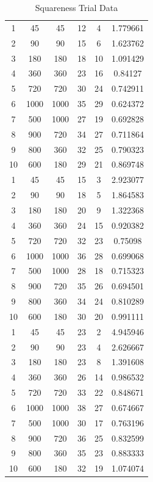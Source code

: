 \documentclass[10pt]{article}
\begin{document}
\begin{table}[H]
\begin{tabular}{cccccc}
        1  & 45   & 45   & 12 & 4  & 1.779661 \\
        2  & 90   & 90   & 15 & 6  & 1.623762 \\
        3  & 180  & 180  & 18 & 10 & 1.091429 \\
        4  & 360  & 360  & 23 & 16 & 0.84127 \\
        5  & 720  & 720  & 30 & 24 & 0.742911 \\
        6  & 1000 & 1000 & 35 & 29 & 0.624372 \\
        7  & 500  & 1000 & 27 & 19 & 0.692828 \\
        8  & 900  & 720  & 34 & 27 & 0.711864 \\
        9  & 800  & 360  & 32 & 25 & 0.790323 \\
        10 & 600  & 180  & 29 & 21 & 0.869748 \\
        \midrule

        1  & 45   & 45   & 15 & 3  & 2.923077 \\
        2  & 90   & 90   & 18 & 5  & 1.864583 \\
        3  & 180  & 180  & 20 & 9  & 1.322368 \\
        4  & 360  & 360  & 24 & 15 & 0.920382 \\
        5  & 720  & 720  & 32 & 23 & 0.75098 \\
        6  & 1000 & 1000 & 36 & 28 & 0.699068 \\
        7  & 500  & 1000 & 28 & 18 & 0.715323 \\
        8  & 900  & 720  & 35 & 26 & 0.694501 \\
        9  & 800  & 360  & 34 & 24 & 0.810289 \\
        10 & 600  & 180  & 30 & 20 & 0.991111 \\
        \midrule

        1  & 45   & 45   & 23 & 2  & 4.945946 \\
        2  & 90   & 90   & 23 & 4  & 2.626667 \\
        3  & 180  & 180  & 23 & 8  & 1.391608 \\
        4  & 360  & 360  & 26 & 14 & 0.986532 \\
        5  & 720  & 720  & 33 & 22 & 0.848671 \\
        6  & 1000 & 1000 & 38 & 27 & 0.674667 \\
        7  & 500  & 1000 & 30 & 17 & 0.763196 \\
        8  & 900  & 720  & 36 & 25 & 0.832599 \\
        9  & 800  & 360  & 35 & 23 & 0.883333 \\
        10 & 600  & 180  & 32 & 19 & 1.074074 \\

        \bottomrule
    \end{tabular}
    \caption{Squareness Trial Data}
\end{table}
\end{document}
